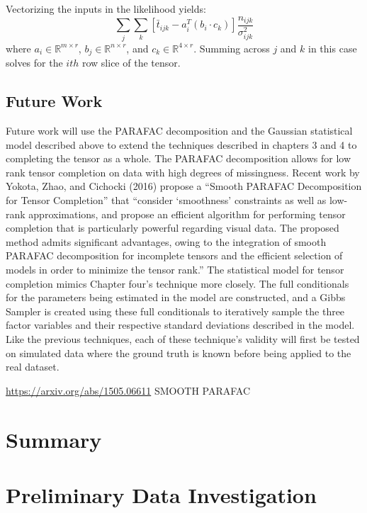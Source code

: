 \documentclass[12pt,twoside]{dukestatscithesis}
\theoremstyle{definition}
\theoremstyle{definition}
\theoremstyle{definition}
\theoremstyle{remark}
\begin{document}
Vectorizing the inputs in the likelihood yields:
\[\sum_j\sum_k[\bar t_{ijk} - a_i^T(b_i \cdotp c_k)]\frac{n_{ijk}}{\sigma^2_{ijk}}\]
where \(a_i \in \mathbb{R}^{m \times r}\),
\(b_j \in \mathbb{R}^{n \times r}\), and
\(c_k \in \mathbb{R}^{4 \times r}\). Summing across \(j\) and \(k\) in
this case solves for the \(ith\) row slice of the tensor.

\section{Future Work}\label{future-work}

Future work will use the PARAFAC decomposition and the Gaussian
statistical model described above to extend the techniques described in
chapters 3 and 4 to completing the tensor as a whole. The PARAFAC
decomposition allows for low rank tensor completion on data with high
degrees of missingness. Recent work by Yokota, Zhao, and Cichocki (2016)
propose a ``Smooth PARAFAC Decomposition for Tensor Completion'' that
``consider `smoothness' constraints as well as low-rank approximations,
and propose an efficient algorithm for performing tensor completion that
is particularly powerful regarding visual data. The proposed method
admits significant advantages, owing to the integration of smooth
PARAFAC decomposition for incomplete tensors and the efficient selection
of models in order to minimize the tensor rank.'' The statistical model
for tensor completion mimics Chapter four's technique more closely. The
full conditionals for the parameters being estimated in the model are
constructed, and a Gibbs Sampler is created using these full
conditionals to iteratively sample the three factor variables and their
respective standard deviations described in the model. Like the previous
techniques, each of these technique's validity will first be tested on
simulated data where the ground truth is known before being applied to
the real dataset.

\url{https://arxiv.org/abs/1505.06611} SMOOTH PARAFAC

\chapter*{Summary}\label{summary}

\appendix

\chapter{Preliminary Data
Investigation}\label{preliminary-data-investigation}
\end{document}
